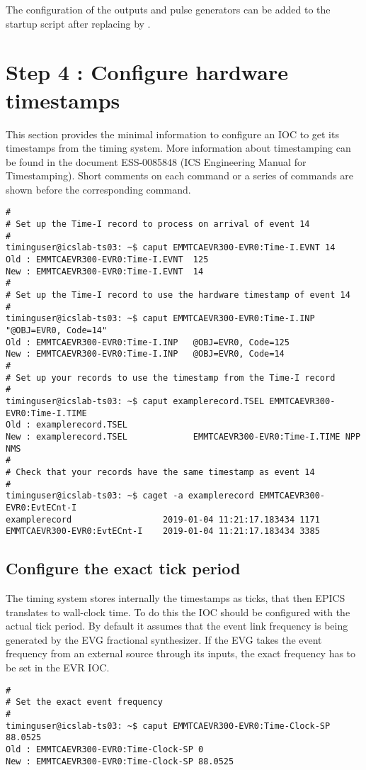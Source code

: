 \documentclass[11pt
  , a4paper
  , article
  , oneside
  , showtrims
]{memoir}
\begin{document}
{The configuration of the outputs and pulse generators can be added to the startup script after  replacing  by .


\section{Step 4 : Configure hardware timestamps}
This section provides the minimal information to configure an IOC to get its timestamps from the timing system. More information about timestamping can be found in the document ESS-0085848 (ICS Engineering Manual for Timestamping). Short comments on each command or a series of commands are shown before the corresponding command.
\begin{lstlisting}[style=termstyle]
#
# Set up the Time-I record to process on arrival of event 14
#
timinguser@icslab-ts03: ~$ caput EMMTCAEVR300-EVR0:Time-I.EVNT 14
Old : EMMTCAEVR300-EVR0:Time-I.EVNT  125
New : EMMTCAEVR300-EVR0:Time-I.EVNT  14
#
# Set up the Time-I record to use the hardware timestamp of event 14
#
timinguser@icslab-ts03: ~$ caput EMMTCAEVR300-EVR0:Time-I.INP "@OBJ=EVR0, Code=14"
Old : EMMTCAEVR300-EVR0:Time-I.INP   @OBJ=EVR0, Code=125
New : EMMTCAEVR300-EVR0:Time-I.INP   @OBJ=EVR0, Code=14
#
# Set up your records to use the timestamp from the Time-I record
#
timinguser@icslab-ts03: ~$ caput examplerecord.TSEL EMMTCAEVR300-EVR0:Time-I.TIME
Old : examplerecord.TSEL
New : examplerecord.TSEL             EMMTCAEVR300-EVR0:Time-I.TIME NPP NMS
#
# Check that your records have the same timestamp as event 14
#
timinguser@icslab-ts03: ~$ caget -a examplerecord EMMTCAEVR300-EVR0:EvtECnt-I
examplerecord                  2019-01-04 11:21:17.183434 1171
EMMTCAEVR300-EVR0:EvtECnt-I    2019-01-04 11:21:17.183434 3385
\end{lstlisting}

\subsection{Configure the exact tick period}
The timing system stores internally the timestamps as ticks, that then EPICS translates to wall-clock time. To do this the IOC should be configured with the actual tick period. By default it assumes that the event link frequency is being generated by the EVG fractional synthesizer. If the EVG takes the event frequency from an external source through its inputs, the exact frequency has to be set in the EVR IOC.
\begin{lstlisting}[style=termstyle]
#
# Set the exact event frequency
#
timinguser@icslab-ts03: ~$ caput EMMTCAEVR300-EVR0:Time-Clock-SP 88.0525
Old : EMMTCAEVR300-EVR0:Time-Clock-SP 0
New : EMMTCAEVR300-EVR0:Time-Clock-SP 88.0525
\end{lstlisting}


}
\end{document}
